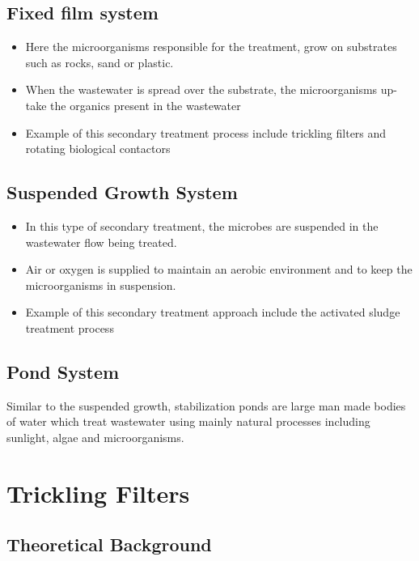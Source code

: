 \section{Fixed film system}	

\begin{itemize}
\item Here the microorganisms responsible for the treatment, grow on substrates such
as rocks, sand or plastic.
\item When the wastewater is spread over the substrate, the microorganisms up-take the organics present in the wastewater
\item Example of this secondary treatment process include trickling filters and rotating biological contactors\\
\end{itemize}

\section{Suspended Growth System}
\begin{itemize}
\item In this type of secondary treatment, the microbes are suspended in the
wastewater flow being treated. 
\item Air or oxygen is supplied to maintain an aerobic environment and to keep the microorganisms in suspension. 
\item Example of this secondary treatment approach include the activated sludge treatment process 
\end{itemize}

\section{Pond System}
Similar to the suspended growth, stabilization ponds are large man made bodies of water which treat wastewater using mainly natural processes including sunlight, algae and microorganisms.





\chapter{Trickling Filters}




\section{Theoretical Background}
		
